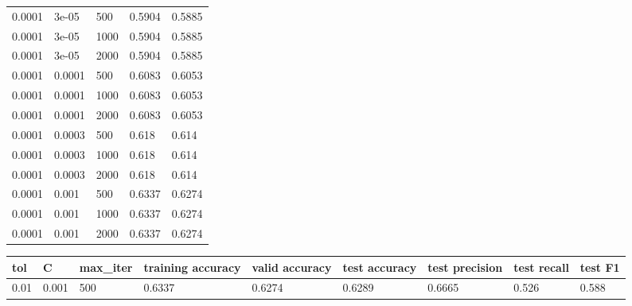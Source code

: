 \documentclass{article}%
\begin{document}
\begin{longtable}{l l l l l}
0.0001&3e{-}05&500&0.5904&0.5885\\%
0.0001&3e{-}05&1000&0.5904&0.5885\\%
0.0001&3e{-}05&2000&0.5904&0.5885\\%
0.0001&0.0001&500&0.6083&0.6053\\%
0.0001&0.0001&1000&0.6083&0.6053\\%
0.0001&0.0001&2000&0.6083&0.6053\\%
0.0001&0.0003&500&0.618&0.614\\%
0.0001&0.0003&1000&0.618&0.614\\%
0.0001&0.0003&2000&0.618&0.614\\%
0.0001&0.001&500&0.6337&0.6274\\%
0.0001&0.001&1000&0.6337&0.6274\\%
0.0001&0.001&2000&0.6337&0.6274\\%
\hline%
\end{longtable}%
\begin{longtable}{l l l l l l l l l}%
\hline%
tol&C&max\_iter&training accuracy&valid accuracy&test accuracy&test precision&test recall&test F1\\%
\hline%
\endhead%
\hline%
0.01&0.001&500&0.6337&0.6274&0.6289&0.6665&0.526&0.588\\%
\hline%
\end{longtable}%
\end{document}
